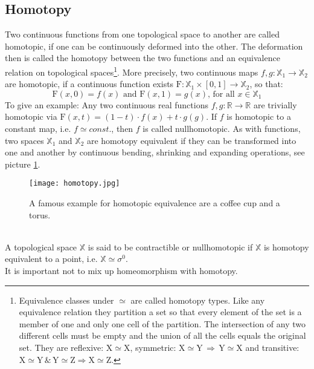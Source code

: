 \subsection{Homotopy}
\label{math_homotopy}

Two continuous functions from one topological space to another are called homotopic, if one can be continuously deformed into the other.
The deformation then is called the homotopy between the two functions and an equivalence relation on topological spaces\footnote{ Equivalence classes under $\simeq$ are called homotopy types. Like any equivalence relation they partition a set so that every element of the set is a member of one and only one cell of the partition. The intersection of any two different cells must be empty and the union of all the cells equals the original set. They are reflexive: $\mathrm{X} \simeq \mathrm{X}$, symmetric: $\mathrm{X} \simeq \mathrm{Y} \, \Rightarrow \, \mathrm{Y} \simeq \mathrm{X}$ and transitive: $\mathrm{X} \simeq \mathrm{Y} \, \& \, \mathrm{Y} \simeq \mathrm{Z} \Rightarrow \mathrm{X} \simeq \mathrm{Z}$.}.
More precisely, two continuous maps $f, g: \mathbb{X}_{1} \rightarrow \mathbb{X}_{2}$ are homotopic, if a continuous function exists $\mathrm{F}: \mathbb{X}_{1} \times [0,1] \rightarrow \mathbb{X}_{2}$, so that:
\begin{equation}
	\mathrm{F}(x, 0) = f(x) \text{ and } \mathrm{F}(x, 1) = g(x) \text{, for all } x \in \mathbb{X}_{1}
\end{equation}
To give an example: Any two continuous real functions $f, g: \mathbb{R} \rightarrow \mathbb{R}$ are trivially homotopic via $\mathrm{F}(x,t) = (1-t) \cdot f(x) + t \cdot g(g)$.
If $f$ is homotopic to a constant map, i.e. $f \simeq const.$, then $f$ is called nullhomotopic.
As with functions, two spaces $\mathbb{X}_{1}$ and $\mathbb{X}_{2}$ are homotopy equivalent if they can be transformed into one and another by continuous bending, shrinking and expanding operations, see picture \ref{fig:homotopy}.
\begin{figure}[htb]
\centering
\texttt{[image: homotopy.jpg]}
\caption{A famous example for homotopic equivalence are a coffee cup and a torus.}
\label{fig:homotopy}
\end{figure}\\
A topological space $\mathbb{X}$ is said to be contractible or nullhomotopic if $\mathbb{X}$ is homotopy equivalent to a point, i.e. $\mathbb{X} \simeq \sigma^{0}$.\\
It is important not to mix up homeomorphism with homotopy.
